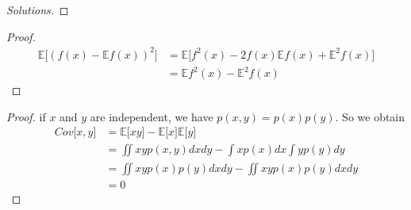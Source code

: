 \documentclass[12pt]{article}
\newcommand{\E}{\mathbb{E}}
\newenvironment{exercise}[2][Ex]{\begin{trivlist}
\item[\hskip \labelsep {\bfseries #1}\hskip \labelsep {\bfseries #2.}]}{\end{trivlist}}
\begin{document}
\begin{exercise}{1.4(**)}
    \begin{proof}[Solutions]
        
    \end{proof}
\end{exercise}
\begin{exercise}{1.5(*)}
    \begin{proof}
        \begin{align*}
            \E\lbrack(f(x)-\E f(x))^2\rbrack&=\E\lbrack f^2(x)-2f(x)\E f(x)+\E^2f(x)\rbrack\\
            &=\E f^2(x)-\E^2f(x)
        \end{align*}
    \end{proof}
\end{exercise}
\begin{exercise}{1.6(*)}
    \begin{proof}
        if $x$ and $y$ are independent, we have $p(x,y)=p(x)p(y)$. So we obtain
        \begin{align*}
            Cov\lbrack x,y\rbrack&=\E\lbrack xy\rbrack-\E\lbrack x\rbrack\E\lbrack y\rbrack\\
            &=\iint xyp(x,y)dxdy-\int xp(x)dx\int yp(y)dy\\
            &=\iint xyp(x)p(y)dxdy-\iint xyp(x)p(y)dxdy\\
            &=0
        \end{align*}
    \end{proof}
\end{exercise}
\end{document}
